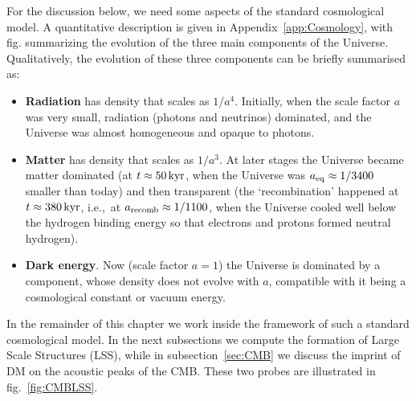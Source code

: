 \medskip


For the discussion below, we need some aspects of the standard cosmological model.
A quantitative description is given in Appendix~\ref{app:Cosmology},
with fig. summarizing the evolution of the three main components of the Universe. 
Qualitatively, the evolution of these three components can be briefly  summarised as:
\begin{itemize}
\item[$\vartriangleright$] {\bf Radiation} has density that scales as $1/a^4$.
Initially, when the scale factor $a$ was very small,
radiation (photons and neutrinos) dominated, and
the Universe was almost homogeneous and opaque to photons.

\item[$\vartriangleright$]  {\bf Matter} has density that scales as $1/a^3$.
At later stages the Universe became matter dominated 
(at $t \approx 50\,{\rm kyr}$, when the Universe was $a_{\rm eq} \approx 1/3400$ smaller than today)
and then transparent
(the `recombination' happened at $t \approx 380\,{\rm kyr}$, i.e.,\ at $a_{\rm recomb} \approx 1/1100$,
when the Universe cooled well below the hydrogen binding energy so that
electrons and protons formed neutral hydrogen).

\item[$\vartriangleright$] {\bf Dark energy}.
Now (scale factor $a=1$) the Universe is dominated by a component, whose density does not evolve with $a$, compatible with it being a cosmological constant or vacuum energy.
\end{itemize}
In the remainder of this chapter we work inside the framework of such a standard cosmological model. 
In the next subsections we compute the formation of Large Scale Structures (LSS), while in subsection~\ref{sec:CMB} we discuss the imprint of DM on the acoustic peaks of the CMB. These two probes are illustrated in fig.~\ref{fig:CMBLSS}. 

